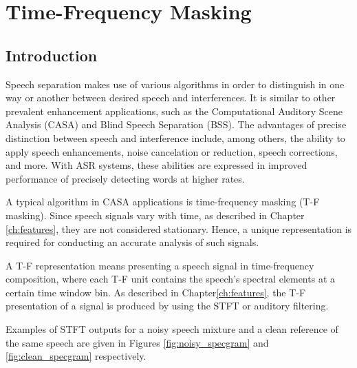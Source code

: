 \chapter{Time-Frequency Masking}\label{ch:tf_mask_ch}
\section{Introduction}
Speech separation makes use of various
algorithms in order to distinguish in one way or another
between desired speech and interferences.
It is similar to other 
prevalent enhancement applications, such as the 
Computational Auditory Scene Analysis (CASA)\cite{BROWN1994297}
and Blind Speech Separation (BSS)\cite{6709849}.
The advantages of precise distinction 
between speech and interference include, among others,
the ability to apply speech enhancements, 
noise cancelation or reduction, speech corrections, and more.
With ASR systems, these abilities are expressed in 
improved performance of precisely detecting words
at higher rates.

A typical algorithm in CASA applications is 
time-frequency masking (T-F masking).
Since speech signals vary with time, 
as described in Chapter \;\ref{ch:features}, 
they are not considered stationary. 
Hence, a unique representation is required 
for conducting an accurate analysis of such signals. 

A T-F representation means presenting a speech 
signal in time-frequency composition, 
where each T-F unit contains the 
speech's spectral elements at a certain time window bin. 
As described in Chapter\;\ref{ch:features}, 
the T-F presentation of a signal 
is produced by using the STFT or auditory filtering\cite{Xia2017UsingOR}.

Examples of STFT outputs for a noisy speech mixture and
a clean reference of the same speech are given in
Figures \ref{fig:noisy_specgram} and \ref{fig:clean_specgram} respectively. 

